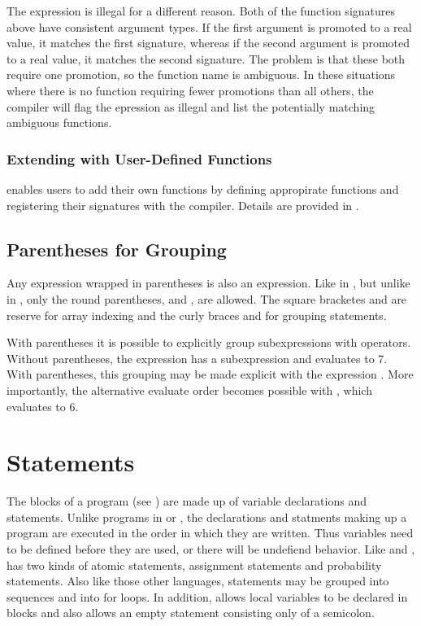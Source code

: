 The expression  is illegal for a different reason.
Both of the function signatures above have consistent argument types.
If the first argument is promoted to a real value, it matches the
first signature, whereas if the second argument is promoted to a real
value, it matches the second signature.  The problem is that these
both require one promotion, so the function name  is
ambiguous.  In these situations where there is no function requiring
fewer promotions than all others, the \Stan compiler will flag the
epression  as illegal and list the potentially matching
ambiguous functions.


\subsection{Extending \Stan with User-Defined Functions}

\Stan enables users to add their own functions by defining appropirate
\Cpp functions and registering their signatures with the \Stan
compiler.  Details are provided in .


\section{Parentheses for Grouping}

Any expression wrapped in parentheses is also an expression. Like in
\Cpp, but unlike in \R, only the round parentheses, \code{(} and
\code{)}, are allowed.  The square bracketes \code{[} and \code{]} are
reserve for array indexing and the curly braces \code{\{} and
\code{\}} for grouping statements.

With parentheses it is possible to explicitly group subexpressions
with operators.  Without parentheses, the expression 
has a subexpression  and evaluates to 7.  With
parentheses, this grouping may be made explicit with the expression
.  More importantly, the alternative evaluate order
becomes possible with , which evaluates to 6.



\chapter{Statements}

The blocks of a \Stan program (see ) are made up of
variable declarations and statements.  Unlike programs in \BUGS or
\JAGS, the declarations and statments making up a \Stan program are
executed in the order in which they are written.  Thus variables need
to be defined before they are used, or there will be undefiend
behavior.  Like \BUGS and \JAGS, \Stan has two kinds of atomic
statements, assignment statements and probability statements.  Also
like those other languages, statements may be grouped into sequences
and into for loops.  In addition, \Stan allows local variables to be
declared in blocks and also allows an empty statement consisting only
of a semicolon.

